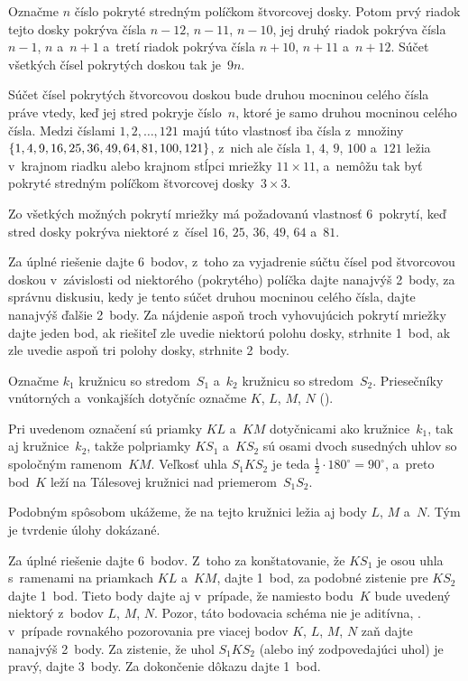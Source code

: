 {%
Označme $n$ číslo pokryté stredným políčkom štvorcovej dosky.
Potom prvý riadok tejto dosky pokrýva čísla $n-12$, $n-11$, $n-10$, jej
druhý riadok pokrýva čísla $n-1$, $n$ a~$n+1$ a~tretí riadok
pokrýva čísla $n+10$, $n+11$ a~$n+12$. Súčet všetkých čísel pokrytých
doskou tak je~$9n$.

Súčet čísel pokrytých štvorcovou doskou bude druhou mocninou
celého čísla práve vtedy, keď jej stred pokryje číslo~$n$, ktoré je samo druhou
mocninou celého čísla. Medzi číslami $1,2,\dots,121$ majú túto vlastnosť iba
čísla z~množiny $\{1,4,9,16,25,36,49,64,81,\penalty0 100,121\}$, z~nich ale
čísla $1$, $4$, $9$, $100$ a~$121$ ležia v~krajnom riadku alebo krajnom stĺpci mriežky
$11{\times}11$, a~nemôžu tak byť pokryté stredným políčkom štvorcovej
dosky~$3{\times}3$.

Zo všetkých možných pokrytí mriežky má požadovanú vlastnosť 6~pokrytí, keď
stred dosky pokrýva niektoré z~čísel $16$, $25$, $36$, $49$, $64$ a~$81$.

\nobreak\medskip\petit\noindent
Za úplné riešenie dajte 6~bodov, z~toho za vyjadrenie súčtu čísel pod
štvorcovou doskou v~závislosti od niektorého (pokrytého) políčka dajte
nanajvýš 2~body, za správnu diskusiu, kedy je tento súčet druhou mocninou
celého čísla, dajte nanajvýš ďalšie 2~body. Za nájdenie aspoň troch vyhovujúcich
pokrytí mriežky dajte jeden bod, ak riešiteľ zle uvedie niektorú polohu
dosky, strhnite 1~bod, ak zle uvedie aspoň tri polohy dosky,
strhnite 2~body.
\endpetit
\bigbreak}

{%
Označme $k_1$ kružnicu so stredom~$S_1$ a~$k_2$ kružnicu so stredom~$S_2$.
Priesečníky vnútorných a~vonkajších dotyčníc označme $K$, $L$, $M$, $N$ (\obr).
%

Pri uvedenom označení sú priamky $KL$ a~$KM$ dotyčnicami ako kružnice~$k_1$,
tak aj kružnice~$k_2$, takže
polpriamky $KS_1$ a~$KS_2$ sú osami dvoch susedných uhlov so spoločným
ramenom~$KM$.
Veľkosť uhla $S_1KS_2$ je teda $\frac12\cdot 180^\circ=90^\circ$,
a~preto bod~$K$ leží na Tálesovej kružnici nad priemerom~$S_1S_2$.

Podobným spôsobom ukážeme, že na tejto kružnici ležia aj body $L$, $M$
a~$N$. Tým je tvrdenie úlohy dokázané.


\nobreak\medskip\petit\noindent
Za úplné riešenie dajte 6~bodov. Z~toho za konštatovanie, že $KS_1$ je
osou uhla s~ramenami na priamkach $KL$ a~$KM$, dajte 1~bod, za podobné zistenie
pre $KS_2$ dajte 1~bod. Tieto body dajte aj v~prípade, že namiesto bodu~$K$
bude uvedený niektorý z~bodov $L$, $M$, $N$. Pozor, táto bodovacia schéma nie je
aditívna, \tj. v~prípade rovnakého pozorovania pre viacej bodov $K$, $L$, $M$, $N$ zaň
dajte nanajvýš 2~body. Za zistenie, že uhol $S_1KS_2$ (alebo iný
zodpovedajúci uhol) je pravý, dajte 3~body. Za dokončenie dôkazu dajte 1~bod.
\endpetit
\bigbreak
}

